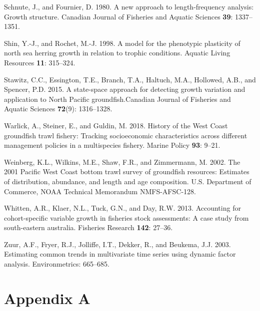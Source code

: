 \documentclass[
]{article}
\newlength{\cslhangindent}
\newlength{\cslentryspacingunit} %
\newenvironment{CSLReferences}[2] %
 {%
  \setlength{\parindent}{0pt}
  \ifodd #1
  \let\oldpar\par
  \def\par{\hangindent=\cslhangindent\oldpar}
  \fi
  \setlength{\parskip}{#2\cslentryspacingunit}
 }%
 {}
\newcommand{\cjfas}{Canadian Journal of Fisheries and Aquatic Sciences\xspace}
\begin{document}
\begin{CSLReferences}{1}{0}
\leavevmode{}%
Schnute, J., and Fournier, D. 1980. A new approach to length-frequency
analysis: Growth structure. Canadian Journal of Fisheries and Aquatic
Sciences \textbf{39}: 1337--1351.

\leavevmode{}%
Shin, Y.-J., and Rochet, M.-J. 1998. A model for the phenotypic
plasticity of north sea herring growth in relation to trophic
conditions. Aquatic Living Resources \textbf{11}: 315--324.

\leavevmode{}%
Stawitz, C.C., Essington, T.E., Branch, T.A., Haltuch, M.A., Hollowed,
A.B., and Spencer, P.D. 2015. A state-space approach for detecting
growth variation and application to {N}orth {P}acific groundfish.\cjfas
\textbf{72}(9): 1316--1328.

\leavevmode{}%
Warlick, A., Steiner, E., and Guldin, M. 2018. {History of the West
Coast groundfish trawl fishery: Tracking socioeconomic characteristics
across different management policies in a multispecies fishery}. Marine
Policy \textbf{93}: 9--21.

\leavevmode{}%
Weinberg, K.L., Wilkins, M.E., Shaw, F.R., and Zimmermann, M. 2002. The
2001 {P}acific {W}est {C}oast bottom trawl survey of groundfish
resources: Estimates of distribution, abundance, and length and age
composition. {U}.{S}. {D}epartment of {C}ommerce, {NOAA} {T}echnical
{M}emorandum {NMFS-AFSC}-128.

\leavevmode{}%
Whitten, A.R., Klaer, N.L., Tuck, G.N., and Day, R.W. 2013. Accounting
for cohort-specific variable growth in fisheries stock assessments: A
case study from south-eastern australia. Fisheries Research
\textbf{142}: 27--36.

\leavevmode{}%
Zuur, A.F., Fryer, R.J., Jolliffe, I.T., Dekker, R., and Beukema, J.J.
2003. Estimating common trends in multivariate time series using dynamic
factor analysis. Environmetrics: 665--685.

\end{CSLReferences}

\pagebreak

\hypertarget{appendix-a}{%
\section*{Appendix A}\label{appendix-a}}
\end{document}
